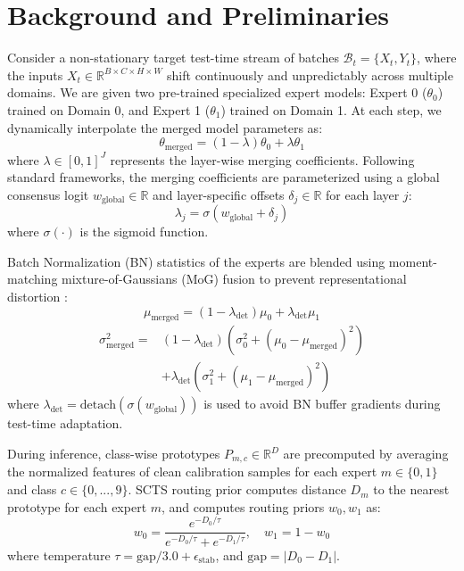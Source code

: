 \documentclass{article}
\theoremstyle{plain}
\theoremstyle{definition}
\theoremstyle{remark}
\begin{document}
\section{Background and Preliminaries}
\label{sec:background}
Consider a non-stationary target test-time stream of batches $\mathcal{B}_t = \{X_t, Y_t\}$, where the inputs $X_t \in \mathbb{R}^{B \times C \times H \times W}$ shift continuously and unpredictably across multiple domains. We are given two pre-trained specialized expert models: Expert 0 ($\theta_0$) trained on Domain 0, and Expert 1 ($\theta_1$) trained on Domain 1. At each step, we dynamically interpolate the merged model parameters as:
\begin{equation}
    \theta_{\text{merged}} = (1 - \lambda)\theta_0 + \lambda\theta_1
\end{equation}
where $\lambda \in [0, 1]^J$ represents the layer-wise merging coefficients. Following standard frameworks, the merging coefficients are parameterized using a global consensus logit $w_{\text{global}} \in \mathbb{R}$ and layer-specific offsets $\delta_j \in \mathbb{R}$ for each layer $j$:
\begin{equation}
    \lambda_j = \sigma(w_{\text{global}} + \delta_j)
\end{equation}
where $\sigma(\cdot)$ is the sigmoid function.

Batch Normalization (BN) \cite{ioffe2015batch} statistics of the experts are blended using moment-matching mixture-of-Gaussians (MoG) fusion to prevent representational distortion \cite{yang2025codemerge}:
\begin{equation}
    \mu_{\text{merged}} = (1 - \lambda_{\text{det}})\mu_0 + \lambda_{\text{det}}\mu_1
\end{equation}
\begin{equation}
\begin{split}
    \sigma^2_{\text{merged}} = {} & (1 - \lambda_{\text{det}})(\sigma^2_0 + (\mu_0 - \mu_{\text{merged}})^2) \\
    & + \lambda_{\text{det}}(\sigma^2_1 + (\mu_1 - \mu_{\text{merged}})^2)
\end{split}
\end{equation}
where $\lambda_{\text{det}} = \text{detach}(\sigma(w_{\text{global}}))$ is used to avoid BN buffer gradients during test-time adaptation.

During inference, class-wise prototypes $P_{m,c} \in \mathbb{R}^D$ are precomputed by averaging the normalized features of clean calibration samples for each expert $m \in \{0, 1\}$ and class $c \in \{0, ..., 9\}$. SCTS routing prior computes distance $D_m$ to the nearest prototype for each expert $m$, and computes routing priors $w_0, w_1$ as:
\begin{equation}
    w_0 = \frac{e^{-D_0/\tau}}{e^{-D_0/\tau} + e^{-D_1/\tau}}, \quad w_1 = 1 - w_0
\end{equation}
where temperature $\tau = \text{gap}/3.0 + \epsilon_{\text{stab}}$, and $\text{gap} = |D_0 - D_1|$.
\end{document}
